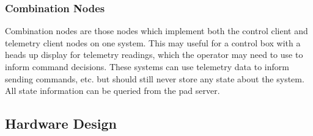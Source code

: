 \subsubsection{Combination Nodes}

Combination nodes are those nodes which implement both the control client and telemetry client nodes on one system. This
may useful for a control box with a heads up display for telemetry readings, which the operator may need to use to
inform command decisions. These systems can use telemetry data to inform sending commands, etc. but should still never
store any state about the system. All state information can be queried from the pad server.

\subsection{Hardware Design}

